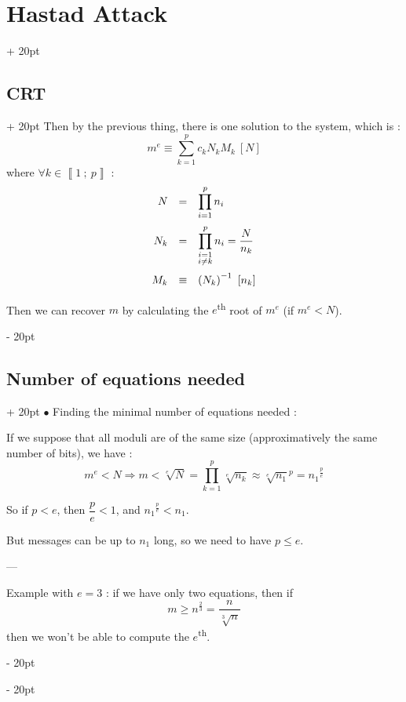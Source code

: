 \documentclass[a4paper, 12pt, twoside]{article}
\newcommand{\nset}[2]{\left\llbracket #1\ ;\ #2 \right\rrbracket}
\newcommand{\lr}[1]{\left( #1 \right)}
\renewcommand{\le}{\leqslant}
\renewcommand{\ge}{\geqslant}
\newcommand{\ind}[1][20pt]{\advance\leftskip + #1}
\newcommand{\deind}[1][20pt]{\advance\leftskip - #1}
\newenvironment{indt}[2][20pt]{#2 \par \ind[#1]}{\par \deind} %
\begin{document}
\begin{indt}{\section{Hastad Attack}}
\begin{indt}{\subsection{CRT}}
            Then by the previous thing, there is one solution to the system, which is :
            \[
                m^e \equiv \sum_{k = 1}^p c_k N_k M_k\ [N]
            \]
            where $\forall k \in \nset 1 p$ :
            \[
                \begin{array}{rcl}
                    N &=& \displaystyle
                    \prod_{i = 1}^p n_i
                    \vspace{6pt}
                    \\
                    N_k &=& \displaystyle
                    \prod_{\substack{i = 1 \\ i \neq k}}^p n_i
                    = \dfrac N {n_k}
                    \vspace{6pt}
                    \\
                    M_k &\equiv& \lr{N_k}^{-1}\ [n_k]
                \end{array}
            \]
            
            Then we can recover $m$ by calculating the $e$\textsuperscript{th} root of $m^e$ (if $m^e < N$).
        \end{indt}

        \vspace{12pt}

        \begin{indt}{\subsection{Number of equations needed}}
            $\bullet$ Finding the minimal number of equations needed :
            
            If we suppose that all moduli are of the same size (approximatively the same number of bits), we have :
            \[
                \displaystyle m^e < N
                \Rightarrow
                m < \sqrt[e]{N}
                = \prod_{k = 1}^p \sqrt[e]{n_k}
                \approx {\sqrt[e]{n_1}}^p
                = {n_1}^{\tfrac p e}
            \]
            
            So if $p < e$, then $\dfrac p e < 1$, and ${n_1}^{\tfrac p e} < n_1$.
            
            But messages can be up to $n_1$ long, so we need to have $p \le e$.
            
            ---
            
            Example with $e = 3$ : if we have only two equations, then if
            \[
                m \ge n^{\tfrac 2 3} = \dfrac{n}{\sqrt[3]{n}}
            \]
            then we won't be able to compute the $e$\textsuperscript{th}.
            

\end{indt}
\end{indt}
\end{document}

